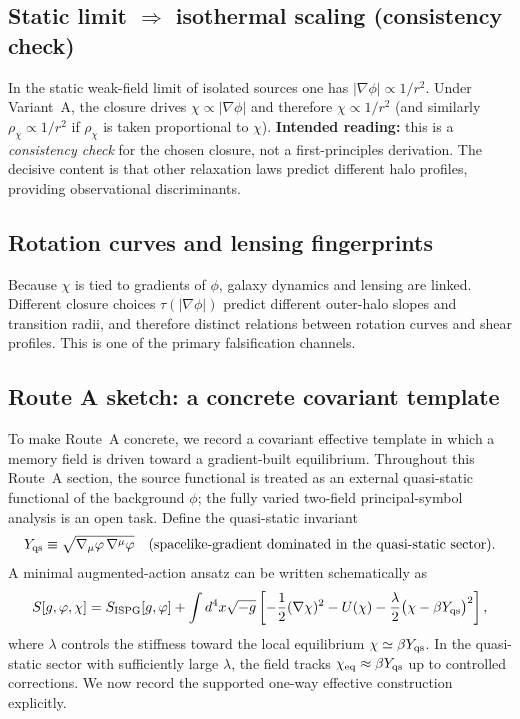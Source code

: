 \documentclass[11pt]{article}
\begin{document}
\subsection{Static limit $\Rightarrow$ isothermal scaling (consistency check)}
In the static weak-field limit of isolated sources one has $|\nabla\phi|\propto 1/r^2$. Under Variant~A, the closure drives $\chi\propto |\nabla\phi|$ and therefore $\chi\propto 1/r^2$ (and similarly $\rho_\chi\propto 1/r^2$ if $\rho_\chi$ is taken proportional to $\chi$).
\textbf{Intended reading:} this is a \emph{consistency check} for the chosen closure, not a first-principles derivation. The decisive content is that other relaxation laws predict different halo profiles, providing observational discriminants.

\subsection{Rotation curves and lensing fingerprints}
Because $\chi$ is tied to gradients of $\phi$, galaxy dynamics and lensing are linked. Different closure choices $\tau(|\nabla\phi|)$ predict different outer-halo slopes and transition radii, and therefore distinct relations between rotation curves and shear profiles. This is one of the primary falsification channels.

\subsection{Route A sketch: a concrete covariant template}\label{sec:routeA}
To make Route~A concrete, we record a covariant effective template in
which a memory field is driven toward a gradient-built equilibrium.
Throughout this Route~A section, the source functional is treated as
an external quasi-static functional of the background $\phi$; the fully
varied two-field principal-symbol analysis is an open task.  Define
the quasi-static invariant
\begin{equation}
Y_{\rm qs} \equiv \sqrt{\nabla_\mu\phi\,\nabla^\mu\phi}\quad
\text{(spacelike-gradient dominated in the quasi-static sector)}.
\end{equation}
A minimal augmented-action ansatz can be written schematically as
\begin{equation}
S[g,\phi,\chi]=S_{\rm ISPG}[g,\phi] + \int d^4x\sqrt{-g}\left[-\frac{1}{2}(\nabla\chi)^2 - U(\chi) - \frac{\lambda}{2}\big(\chi-\beta Y_{\rm qs}\big)^2\right],
\label{eq:augaction}
\end{equation}
where $\lambda$ controls the stiffness toward the local equilibrium
$\chi\simeq \beta Y_{\rm qs}$. In the quasi-static sector with
sufficiently large $\lambda$, the field tracks
$\chi_{\rm eq}\approx \beta Y_{\rm qs}$ up to controlled corrections.
We now record the supported one-way effective construction explicitly.
\end{document}
